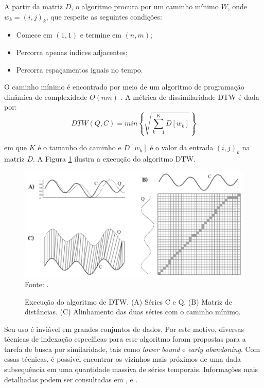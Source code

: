 A partir da matriz \({D}\), o algoritmo procura por um caminho mínimo \({W}\), onde \({w_{k} = (i,j)_{k}}\), que respeite as seguintes condições:

\begin{itemize}
    \item Comece em \({(1,1)}\) e termine em \({(n,m)}\);
    \item Percorra apenas índices adjacentes;
    \item Percorra espaçamentos iguais no tempo.
\end{itemize}

O caminho mínimo é encontrado por meio de um algoritmo de programação dinâmica de complexidade \({O(nm)}\) \cite{keogh2004}. A métrica de dissimilaridade DTW é dada por:
\begin{equation}
    DTW(Q,C) = min\left\{\sqrt{\sum_{k=1}^{K} D[w_{k}]}\right\}
\end{equation}

em que \({K}\) é o tamanho do caminho e \({D[w_{k}]}\) é o valor da entrada \({(i,j)_{k}}\) na matriz \({D}\). A Figura \ref{fig:dtw} ilustra a execução do algoritmo DTW.

\begin{figure}[!htb]
   \centering
   \caption{Execução do algoritmo de DTW. (A) Séries C e Q. (B) Matriz de distâncias. (C) Alinhamento das duas séries com o caminho mínimo.}\label{fig:dtw} 
   \includegraphics[scale=0.40]{figuras/dtw.png}
   \\Fonte: \cite{keogh2004}.
\end{figure}

Seu uso é inviável em grandes conjuntos de dados. Por este motivo, diversas técnicas de indexação específicas para esse algoritmo foram propostas para a tarefa de busca por similaridade, tais como \textit{lower bound} e \textit{early abandoning}. Com essas técnicas, é possível encontrar os vizinhos mais próximos de uma dada subsequência em uma quantidade massiva de séries temporais. Informações mais detalhadas podem ser consultadas em \cite{mizutani2006}, \cite{kruskal1983} e \cite{juang1991}.

